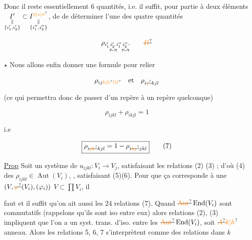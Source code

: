 
Donc il reste essentiellement 6 quantités, i.e.  il suffit, pour    partie à deux éléments $\underset{\substack{\Vert\\\{i'_1,i'_2\}}}{I'}\subset \underset{\substack{\Vert\\\{i''_1,i''_2\}}}{I^{\unsure{2|*|\prime\prime}}}$, de de déterminer l'une des quatre quantités

\[
 \rho_{\underset{\tikz{\draw[<->] (0,0) to[bend right=35] (.36,0);}}{i'_1\,i'_2}\;
 \underset{\tikz{\draw[<->] (0,0) to[bend right=35] (.36,0);}}{i''_1\,i''_2}}.
 \qquad\deleted{\unsure{Il}}
\]

$\star$ Nous allons  enfin donner une formule pour relier

\[
\rho_{ij\unsure{k|h}\unsure{l|\ell}}\quad\text{et}\quad\rho_{i\deleted{\unsure{j}}kjl}
\]

(ce qui permettra donc de passer d'un repère à un repère quelconque)

\[
 \rho_{ijkl}+\rho_{ikjl}=1
\]

i.e

\[
\boxed{\rho_{i\deleted{\unsure{jk}}kjl}=1-\rho_{i\deleted{\unsure{kj}}jkl}}\tag*{(7)}
\]

\margin{[ Faire vérification}

\uline{Prop} Soit un système de $u_{ijkl}:V_i\longrightarrow V_j$, satisfaisant les relations (2) (3) ; d'où (4) des $\rho_{ijkl}\in\operatorname{Aut}(V_i)$, \unsure{)}, satisfaisant (5)(6). Pour que ça corresponde à une   $(V,\deleted{\unsure{\varphi}}(V_i),(\varphi_i))$ \deleted{\unsure{$\subset$}} $V\subset\prod V_i$, il


faut et il suffit qu'on ait aussi les 24 relations (7). Quand  $\deleted{\unsure{\operatorname{Aut}}}\operatorname{End}(V_i)$ sont commutatifs (rappelons qu'ils sont iso entre eux) alors    relations (2), (3) impliquent que l'on a un syst. trans. d'iso. entre les  $\deleted{\unsure{\operatorname{Aut}}}\operatorname{End}(V_i)$, soit $\deleted{\unsure{A}}\unsure{k|h}$  anneau. Alors les relations 5, 6, 7 s'interprètent comme des relations dans  $k$

